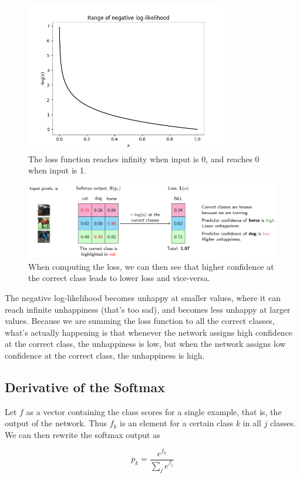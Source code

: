 \documentclass{report}
\begin{document}
\begin{figure}[h]
	\includegraphics[width=250pt]{10}
	\centering
	\caption{The loss function reaches infinity when input is 0, and reaches 0 when input is 1.}
\end{figure}

\clearpage
\begin{figure}[ht]
	\includegraphics[width=350pt]{11}
	\centering
	\caption{When computing the loss, we can then see that higher confidence at the correct class leads to lower loss and vice-versa.}
\end{figure}
The negative log-likelihood becomes unhappy at smaller values, where it can reach infinite unhappiness (that’s too sad), and becomes less unhappy at larger values. Because we are summing the loss function to all the correct classes, what’s actually happening is that whenever the network assigns high confidence at the correct class, the unhappiness is low, but when the network assigns low confidence at the correct class, the unhappiness is high.


\subsection{Derivative of the Softmax}
Let $f$ as a vector containing the class scores for a single example, that is, the output of the network. Thus $f_k$ is an element for a certain class $k$ in all $j$ classes. We can then rewrite the softmax output as

$$p_k = \frac{e^{f_k}}{\sum_j e^{f_j}}$$
\end{document}
